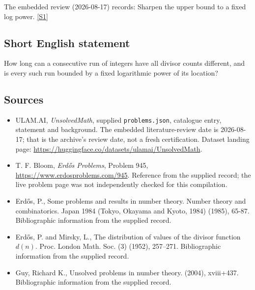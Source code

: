 \documentclass[11pt,a4paper]{article}
\newcommand{\sref}[2]{\hyperlink{source:#1:#2}{[S#2]}}
\begin{document}
The embedded review (2026-08-17) records: Sharpen the upper bound to a fixed log power. \sref{statement}{1}

\subsection{Short English statement}

How long can a consecutive run of integers have all divisor counts different, and is every such run bounded by a fixed logarithmic power of its location?

\subsection{Sources}

{\small

\begin{itemize}

\item[\hypertarget{source:statement:1}{S1}] ULAM.AI, \emph{UnsolvedMath}, supplied \texttt{problems.json}, catalogue entry, statement and background. The embedded literature-review date is 2026-08-17; that is the archive’s review date, not a fresh certification. Dataset landing page: \url{https://huggingface.co/datasets/ulamai/UnsolvedMath}.

\item[\hypertarget{source:statement:2}{S2}] T. F. Bloom, \emph{Erdős Problems}, Problem 945, \url{https://www.erdosproblems.com/945}. Reference from the supplied record; the live problem page was not independently checked for this compilation.

\item[\hypertarget{source:statement:3}{S3}] Erd\H{o}s, P., Some problems and results in number theory. Number theory and combinatorics. Japan 1984 (Tokyo, Okayama and Kyoto, 1984) (1985), 65-87. Bibliographic information from the supplied record.

\item[\hypertarget{source:statement:4}{S4}] Erd\H{o}s, P. and Mirsky, L., The distribution of values of the divisor function {$d(n)$}. Proc. London Math. Soc. (3) (1952), 257--271. Bibliographic information from the supplied record.

\item[\hypertarget{source:statement:5}{S5}] Guy, Richard K., Unsolved problems in number theory. (2004), xviii+437. Bibliographic information from the supplied record.

\end{itemize}

}

\label{end:statement}
\end{document}
